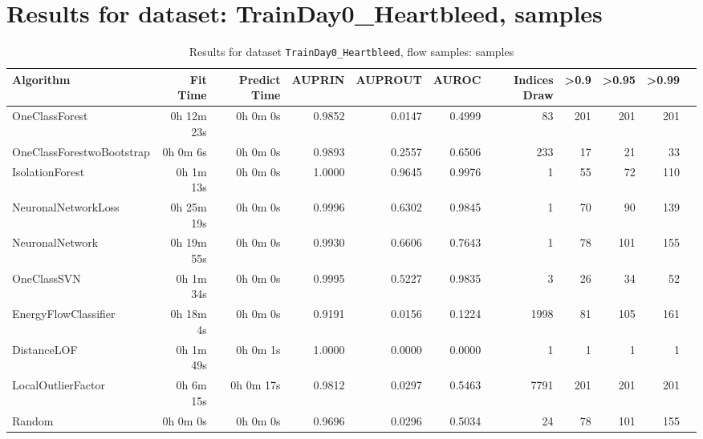 \documentclass{article}
\begin{document}
\section*{Results for dataset: TrainDay0_Heartbleed, samples}
\begin{table}[h!]
\centering
\caption{Results for dataset \texttt{TrainDay0_Heartbleed}, flow samples: samples}
\label{tab:trainday0heartbleed_samples}
\begin{tabular}{lrrrrrrrrrr}
\toprule
Algorithm & Fit Time & Predict Time & AUPRIN & AUPROUT & AUROC & Indices Draw & >0.9 & >0.95 & >0.99 \\
\midrule
OneClassForest & 0h 12m 23s & 0h 0m 0s & 0.9852 & 0.0147 & 0.4999 & 83 & 201 & 201 & 201 \\
OneClassForestwoBootstrap & 0h 0m 6s & 0h 0m 0s & 0.9893 & 0.2557 & 0.6506 & 233 & 17 & 21 & 33 \\
IsolationForest & 0h 1m 13s & 0h 0m 0s & 1.0000 & 0.9645 & 0.9976 & 1 & 55 & 72 & 110 \\
NeuronalNetworkLoss & 0h 25m 19s & 0h 0m 0s & 0.9996 & 0.6302 & 0.9845 & 1 & 70 & 90 & 139 \\
NeuronalNetwork & 0h 19m 55s & 0h 0m 0s & 0.9930 & 0.6606 & 0.7643 & 1 & 78 & 101 & 155 \\
OneClassSVN & 0h 1m 34s & 0h 0m 0s & 0.9995 & 0.5227 & 0.9835 & 3 & 26 & 34 & 52 \\
EnergyFlowClassifier & 0h 18m 4s & 0h 0m 0s & 0.9191 & 0.0156 & 0.1224 & 1998 & 81 & 105 & 161 \\
DistanceLOF & 0h 1m 49s & 0h 0m 1s & 1.0000 & 0.0000 & 0.0000 & 1 & 1 & 1 & 1 \\
LocalOutlierFactor & 0h 6m 15s & 0h 0m 17s & 0.9812 & 0.0297 & 0.5463 & 7791 & 201 & 201 & 201 \\
Random & 0h 0m 0s & 0h 0m 0s & 0.9696 & 0.0296 & 0.5034 & 24 & 78 & 101 & 155 \\
\bottomrule
\end{tabular}
\end{table}
\end{document}
